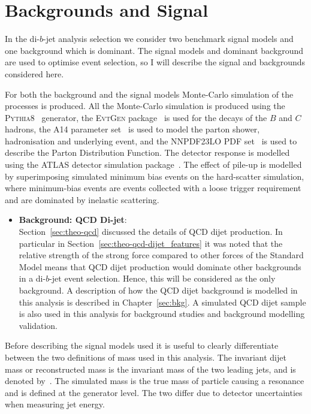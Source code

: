 \section{Backgrounds and Signal}
\label{sec:evt-s+b}

In the di-$b$-jet analysis selection we consider two
benchmark signal models and one background which is dominant.
The signal models and dominant background are
used to optimise event selection, so I will describe
the signal and backgrounds considered here.

For both the background and the signal models Monte-Carlo simulation of the processes is produced.
All the Monte-Carlo simulation is produced using the \textsc{Pythia8}~\cite{dibjet-pythia8} generator,
the \textsc{EvtGen} package~\cite{trig-evtGen} is used for the decays of the $B$ and $C$ hadrons,
the A14 parameter set~\cite{dibjet-a14} is used to model the parton shower, hadronisation and underlying event,
and the NNPDF23LO PDF set~\cite{dibjet-nnpdf} is used to describe the Parton Distribution Function.
The detector response is modelled using the ATLAS detector simulation package~\cite{dijet-sim_ATLAS}.
The effect of pile-up is modelled by superimposing simulated minimum bias events
on the hard-scatter simulation,
where minimum-bias events are events collected with a loose trigger requirement
and are dominated by inelastic scattering.

\begin{itemize}[leftmargin=*]
\item\textbf{Background: QCD Di-jet}: \\
  Section~\ref{sec:theo-qcd} discussed the details of QCD dijet production.
  In particular in Section~\ref{sec:theo-qcd-dijet_features} it was noted that the
  relative strength of the strong force compared to other forces
  of the Standard Model means that
  QCD dijet production would dominate other backgrounds in a di-$b$-jet event selection.
  Hence, this will be considered as the only background.
  A description of how the QCD dijet background is modelled in this analysis is described in Chapter~\ref{sec:bkg}.
  A simulated QCD dijet sample is also used in this analysis
  for background studies and background modelling validation.
  \end{itemize}

\noindent
Before describing the signal models used it is useful to clearly differentiate between the two definitions of mass used in this analysis.
The invariant dijet mass or reconstructed mass is the invariant mass of the two leading jets, and is denoted by~\mjj.
The simulated mass is the true mass of particle causing a resonance and is defined at the generator level.
The two differ due to detector uncertainties when measuring jet energy.

